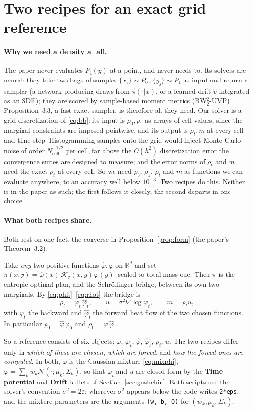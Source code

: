 \documentclass[11pt]{article}
\newcommand{\eps}{\varepsilon}
\newcommand{\code}[1]{\texttt{#1}}
\newcommand{\R}{\mathbb{R}}
\newcommand{\Nc}{\mathcal{N}}
\newcommand{\Kc}{\mathcal{K}}
\newcommand{\hphi}{\hat\varphi}
\theoremstyle{definition}
\theoremstyle{plain}
\begin{document}
\section{Two recipes for an exact grid reference}
\label{sec:ours}

\paragraph{Why we need a density at all.}
The paper never evaluates $P_1(y)$ at a point, and never needs to. Its solvers are neural: they
take two bags of samples $\{x_i\}\sim P_0$, $\{y_j\}\sim P_1$ as input and return a sampler
(a network producing draws from $\hat\pi(\cdot|x)$, or a learned drift $\hat v$ integrated as an
SDE); they are scored by sample-based moment metrics (BW$_2^2$-UVP). Proposition~3.3, a fast
exact sampler, is therefore all they need. Our solver is a grid discretization of
\eqref{eq:bb}: its input is $\rho_0,\rho_1$ as arrays of cell values, since the marginal
constraints are imposed pointwise, and its output is $\rho_t,m$ at every cell and time step.
Histogramming samples onto the grid would inject Monte Carlo noise of order
$N_{\mathrm{cell}}^{-1/2}$ per cell, far above the $O(h^2)$ discretization error the convergence
suites are designed to measure; and the error norms of $\rho_t$ and $m$ need the exact
$\rho_t$ at every cell. So we need $\rho_0$, $\rho_1$, $\rho_t$ and $m$ as functions we can
evaluate anywhere, to an accuracy well below $10^{-3}$. Two recipes do this. Neither is in
the paper as such; the first follows it closely, the second departs in one choice.

\paragraph{What both recipes share.}
Both rest on one fact, the converse in Proposition~\ref{prop:form} (the paper's Theorem~3.2):
\begin{keybox}
Take \emph{any} two positive functions $\hphi,\varphi$ on $\R^d$ and set
$\pi(x,y)=\hphi(x)\,\Kc_\sigma(x,y)\,\varphi(y)$, scaled to total mass one. Then $\pi$ is the
entropic-optimal plan, and the Schr\"odinger bridge, between its own two marginals. By
\eqref{eq:phit}--\eqref{eq:rhot} the bridge is
\[
  \rho_t=\varphi_t\,\hphi_t,\qquad u=\sigma^2\nabla\log\varphi_t,\qquad m=\rho_tu,
\]
with $\varphi_t$ the backward and $\hphi_t$ the forward heat flow of the two chosen functions.
In particular $\rho_0=\hphi\,\varphi_0$ and $\rho_1=\varphi\,\hphi_1$.
\end{keybox}
So a reference consists of six objects: $\varphi$, $\varphi_t$, $\hphi$, $\hphi_t$, $\rho_t$, $u$.
The two recipes differ only in \emph{which of these are chosen}, \emph{which are forced}, and
\emph{how the forced ones are computed}. In both, $\varphi$ is the Gaussian mixture
\eqref{eq:mixphi}, $\varphi=\sum_kw_k\Nc(\cdot;\mu_k,\Sigma_k)$, so that $\varphi_t$ and $u$
are closed form by the \textbf{Time potential} and \textbf{Drift} bullets of
Section~\ref{sec:gushchin}. Both scripts use the solver's convention $\sigma^2=2\eps$: wherever
$\sigma^2$ appears below the code writes \code{2*eps}, and the mixture parameters are the
arguments \code{(w, b, Q)} for $(w_k,\mu_k,\Sigma_k)$.
\end{document}
